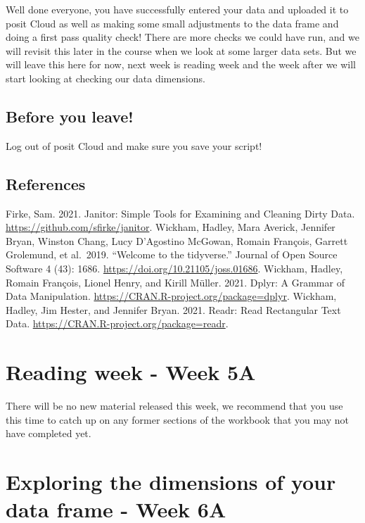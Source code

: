 \documentclass[
]{book}
\begin{document}
Well done everyone, you have successfully entered your data and uploaded it to posit Cloud as well as making some small adjustments to the data frame and doing a first pass quality check! There are more checks we could have run, and we will revisit this later in the course when we look at some larger data sets. But we will leave this here for now, next week is reading week and the week after we will start looking at checking our data dimensions.

\hypertarget{before-you-leave}{%
\section{Before you leave!}\label{before-you-leave}}

Log out of posit Cloud and make sure you save your script!

\hypertarget{references-1}{%
\section{References}\label{references-1}}

Firke, Sam. 2021. Janitor: Simple Tools for Examining and Cleaning Dirty Data. \url{https://github.com/sfirke/janitor}.
Wickham, Hadley, Mara Averick, Jennifer Bryan, Winston Chang, Lucy D'Agostino McGowan, Romain François, Garrett Grolemund, et al.~2019. ``Welcome to the tidyverse.'' Journal of Open Source Software 4 (43): 1686. \url{https://doi.org/10.21105/joss.01686}.
Wickham, Hadley, Romain François, Lionel Henry, and Kirill Müller. 2021. Dplyr: A Grammar of Data Manipulation. \url{https://CRAN.R-project.org/package=dplyr}.
Wickham, Hadley, Jim Hester, and Jennifer Bryan. 2021. Readr: Read Rectangular Text Data. \url{https://CRAN.R-project.org/package=readr}.

\hypertarget{reading-week---week-5a}{%
\chapter{Reading week - Week 5A}\label{reading-week---week-5a}}

There will be no new material released this week, we recommend that you use this time to catch up on any former sections of the workbook that you may not have completed yet.

\hypertarget{dimensions}{%
\chapter{Exploring the dimensions of your data frame - Week 6A}\label{dimensions}}
\end{document}
